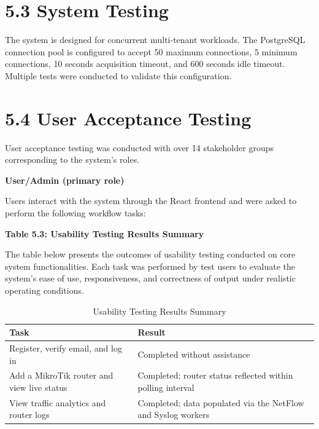 \documentclass[12pt,a4paper,oneside]{report}
\begin{document}
\section{5.3 System Testing}

The system is designed for concurrent multi-tenant workloads. The PostgreSQL connection pool is configured to accept 50 maximum connections, 5 minimum connections, 10 seconds acquisition timeout, and 600 seconds idle timeout. Multiple tests were conducted to validate this configuration.

\section{5.4 User Acceptance Testing}

User acceptance testing was conducted with over 14 stakeholder groups corresponding to the system's roles.

\textbf{User/Admin (primary role)}

Users interact with the system through the React frontend and were asked to perform the following workflow tasks:

\textbf{Table 5.3: Usability Testing Results Summary}

\vspace{0.3cm}
The table below presents the outcomes of usability testing conducted on core system functionalities. Each task was performed by test users to evaluate the system's ease of use, responsiveness, and correctness of output under realistic operating conditions.

\begin{table}[htbp]
  \centering
  \caption{Usability Testing Results Summary}
  {\small
  \begin{tabular}{|p{6.66cm}|p{8.00cm}|}
    \hline
    \textbf{Task} & \textbf{Result} \\
    \hline
    Register, verify email, and log in & Completed without assistance \\
    Add a MikroTik router and view live status & Completed; router status reflected within polling interval \\
    View traffic analytics and router logs & Completed; data populated via the NetFlow and Syslog workers \\
    \hline
  \end{tabular}
  }
\end{table}

\end{document}
